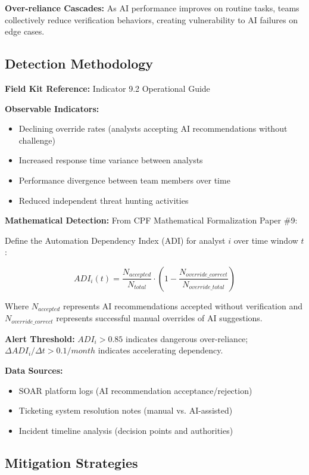 \documentclass[11pt,a4paper]{article}
\begin{document}
\textbf{Over-reliance Cascades:} As AI performance improves on routine tasks, teams collectively reduce verification behaviors, creating vulnerability to AI failures on edge cases.

\subsection{Detection Methodology}

\textbf{Field Kit Reference:} Indicator 9.2 Operational Guide

\textbf{Observable Indicators:}
\begin{itemize}
\item Declining override rates (analysts accepting AI recommendations without challenge)
\item Increased response time variance between analysts
\item Performance divergence between team members over time
\item Reduced independent threat hunting activities
\end{itemize}

\textbf{Mathematical Detection:} From CPF Mathematical Formalization Paper \#9:

Define the Automation Dependency Index (ADI) for analyst $i$ over time window $t$:

\begin{equation}
ADI_i(t) = \frac{N_{accepted}}{N_{total}} \cdot \left(1 - \frac{N_{override\_correct}}{N_{override\_total}}\right)
\end{equation}

Where $N_{accepted}$ represents AI recommendations accepted without verification and $N_{override\_correct}$ represents successful manual overrides of AI suggestions.

\textbf{Alert Threshold:} $ADI_i > 0.85$ indicates dangerous over-reliance; $\Delta ADI_i / \Delta t > 0.1/month$ indicates accelerating dependency.

\textbf{Data Sources:}
\begin{itemize}
\item SOAR platform logs (AI recommendation acceptance/rejection)
\item Ticketing system resolution notes (manual vs. AI-assisted)
\item Incident timeline analysis (decision points and authorities)
\end{itemize}

\subsection{Mitigation Strategies}
\end{document}
